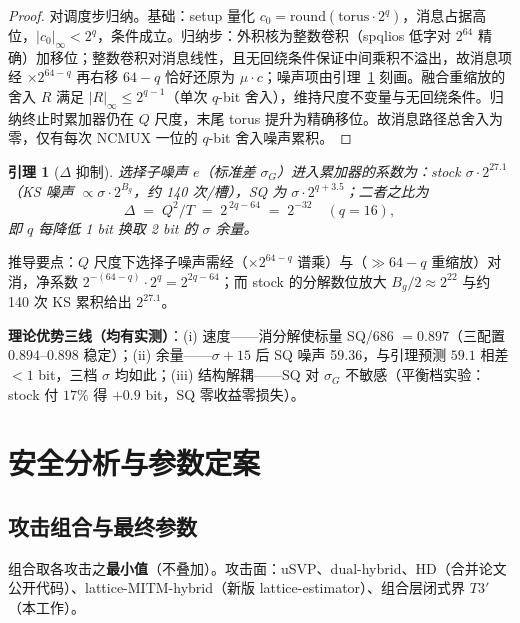\documentclass[11pt]{article}
\newtheorem{lemma}[theorem]{引理}
\begin{document}
\begin{proof}
对调度步归纳。基础：setup 量化 $c_0=\mathrm{round}(\text{torus}\cdot 2^{q})$，消息占据高位，$|c_0|_\infty<2^q$，条件成立。归纳步：外积核为整数卷积（spqlios 低字对 $2^{64}$ 精确）加移位；整数卷积对消息线性，且无回绕条件保证中间乘积不溢出，故消息项经 $\times 2^{64-q}$ 再右移 $64{-}q$ 恰好还原为 $\mu\cdot c$；噪声项由引理~\ref{lem:1} 刻画。融合重缩放的舍入 $R$ 满足 $|R|_\infty\le 2^{q-1}$（单次 $q$-bit 舍入），维持尺度不变量与无回绕条件。归纳终止时累加器仍在 $Q$ 尺度，末尾 torus 提升为精确移位。故消息路径总舍入为零，仅有每次 NCMUX 一位的 $q$-bit 舍入噪声累积。
\end{proof}

\begin{lemma}[$\Delta$ 抑制]
\label{lem:1}
选择子噪声 $e$（标准差 $\sigma_G$）进入累加器的系数为：stock $\sigma\cdot 2^{27.1}$（KS 噪声 $\propto\sigma\cdot 2^{B_g}$，约 140 次/槽），SQ 为 $\sigma\cdot 2^{q+3.5}$；二者之比为
\[
\Delta \;=\; Q^2/T \;=\; 2^{\,2q-64}\;=\;2^{-32}\quad(q=16),
\]
即 $q$ 每降低 1 bit 换取 2 bit 的 $\sigma$ 余量。
\end{lemma}

推导要点：$Q$ 尺度下选择子噪声需经（$\times 2^{64-q}$ 谱乘）与（$\gg 64{-}q$ 重缩放）对消，净系数 $2^{-(64-q)}\cdot 2^{q}=2^{2q-64}$；而 stock 的分解数位放大 $B_g/2\approx 2^{22}$ 与约 140 次 KS 累积给出 $2^{27.1}$。

\textbf{理论优势三线（均有实测）}：(i) 速度——消分解使标量 SQ/686 $=0.897$（三配置 $0.894$--$0.898$ 稳定）；(ii) 余量——$\sigma{+}15$ 后 SQ 噪声 59.36，与引理预测 $59.1$ 相差 $<1$ bit，三档 $\sigma$ 均如此；(iii) 结构解耦——SQ 对 $\sigma_G$ 不敏感（平衡档实验：stock 付 $17\%$ 得 $+0.9$ bit，SQ 零收益零损失）。

\section{安全分析与参数定案}

\subsection{攻击组合与最终参数}

组合取各攻击之\textbf{最小值}（不叠加）。攻击面：uSVP、dual-hybrid、HD（合并论文公开代码）、lattice-MITM-hybrid（新版 lattice-estimator）、组合层闭式界 $T3'$（本工作）。
\end{document}

